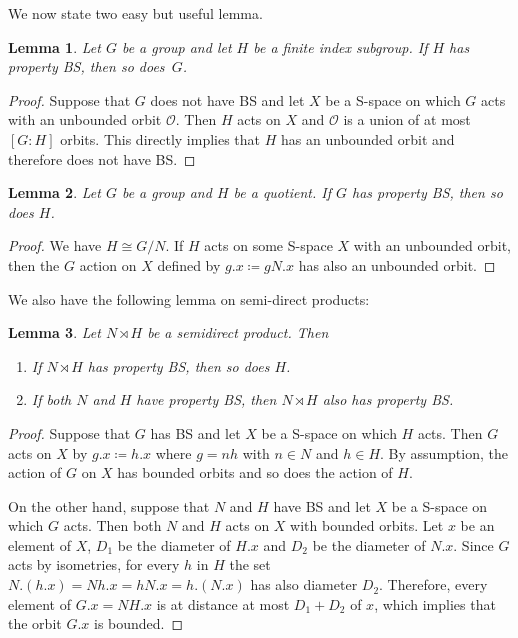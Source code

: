 \documentclass[a4paper]{article}
\newtheorem{lem}{Lemma}[section]
\theoremstyle{definition}
\theoremstyle{remark}%
\newcommand*{\orbite}{\mathcal O}
\begin{document}
We now state two easy but useful lemma.
%
%
\begin{lem}\label{Lemma:Subgroup}
Let $G$ be a group and let $H$ be a finite index subgroup.
If $H$ has property BS, then so does~$G$.
\end{lem}
\begin{proof}
Suppose that $G$ does not have BS and let $X$ be a S-space on which $G$ acts with an unbounded orbit $\orbite$.
Then $H$ acts on $X$ and $\orbite$ is a union of at most $[G:H]$ orbits. This directly implies that $H$ has an unbounded orbit and therefore does not have BS.
\end{proof}
%
%
\begin{lem}\label{Lemma:Quotient}
Let $G$ be a group and $H$ be a quotient.
If $G$ has property BS, then so does $H$.
\end{lem}
\begin{proof}
We have $H\cong G/N$. If $H$ acts on some S-space $X$ with an unbounded orbit, then the $G$ action on $X$ defined by $g.x\coloneqq gN.x$ has also an unbounded orbit.
\end{proof}
%
%
We also have the following lemma on semi-direct products:
%
%
\begin{lem}\label{Lemma:Semidirect}
Let $N\rtimes H$ be a semidirect product. Then
\begin{enumerate}
\item
If $N\rtimes H$ has property BS, then so does $H$.
\item
If both $N$ and $H$ have property BS, then $N\rtimes H$ also has property BS.
\end{enumerate}
\end{lem}
\begin{proof}
Suppose that $G$ has BS and let $X$ be a S-space on which $H$ acts.
Then $G$ acts on $X$ by $g.x\coloneqq h.x$ where $g=nh$ with $n\in N$ and $h\in H$.
By assumption, the action of $G$ on $X$ has bounded orbits and so does the action of $H$.

On the other hand, suppose that $N$ and $H$ have BS and let $X$ be a S-space on which $G$ acts.
Then both $N$ and $H$ acts on $X$ with bounded orbits.
Let $x$ be an element of $X$, $D_1$ be the diameter of $H.x$ and $D_2$ be the diameter of $N.x$.
Since $G$ acts by isometries, for every $h$ in $H$ the set $N.(h.x)=Nh.x=hN.x=h.(N.x)$ has also diameter $D_2$.
Therefore, every element of $G.x=NH.x$ is at distance at most $D_1+D_2$ of $x$, which implies that the orbit $G.x$ is bounded. %
\end{proof}
\end{document}
